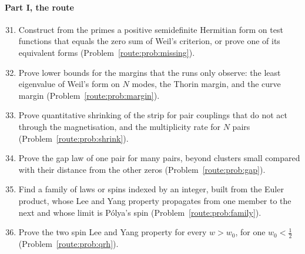 \paragraph{Part I, the route}
\begin{enumerate}
\setcounter{enumi}{30}
\item Construct from the primes a positive semidefinite Hermitian form on test functions that equals the zero sum of Weil's criterion, or prove one of its equivalent forms (Problem~\ref{route:prob:missing}).
\item Prove lower bounds for the margins that the runs only observe: the least eigenvalue of Weil's form on $N$ modes, the Thorin margin, and the curve margin (Problem~\ref{route:prob:margin}).
\item Prove quantitative shrinking of the strip for pair couplings that do not act through the magnetisation, and the multiplicity rate for $N$ pairs (Problem~\ref{route:prob:shrink}).
\item Prove the gap law of one pair for many pairs, beyond clusters small compared with their distance from the other zeros (Problem~\ref{route:prob:gap}).
\item Find a family of laws or spins indexed by an integer, built from the Euler product, whose Lee and Yang property propagates from one member to the next and whose limit is P\'olya's spin (Problem~\ref{route:prob:family}).
\item Prove the two spin Lee and Yang property for every $w>w_0$, for one $w_0<\frac12$ (Problem~\ref{route:prob:qrh}).
\end{enumerate}

